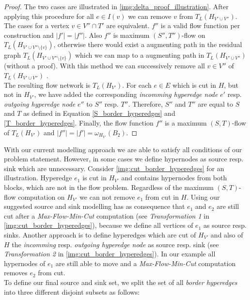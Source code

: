 \begin{proof}
The two cases are illustrated in \autoref{img:delta_proof_illustration}.
After applying this procedure for all $e \in I(v)$ we can remove $v$ from $T_L(H_{V' \cup V''})$. 
The cases for a vertex $v \in V'' \cap T'$ are equivalent. 
$f''$ is a valid flow function per construction and $|f'| = |f''|$. Also $f''$
is maximum $(S'',T'')$-flow on $T_L(H_{V' \cup V''\setminus \{v\}})$, otherwise
there would exist a augmenting path in the residual graph $T_L(H_{V' \cup V''\setminus \{v\}})$
which we can map to a augmenting path in $T_L(H_{V' \cup V''})$ (without a proof). With this method 
we can successively remove all $v \in V''$ of $T_L(H_{V' \cup V''})$ . \\
The resulting  flow network is $T_L(H_{V'})$. For each $e \in E$ which is cut in $H$, but not
in $H_{V'}$, we have added the corresponding \emph{incomming hyperedge node} $e'$
resp. \emph{outgoing hyperedge node} $e''$ to $S''$ resp. $T''$. Therefore, 
$S''$ and $T''$ are equal to $S$ and $T$ as defined in Equation \ref{S_border_hyperedges}
and \ref{T_border_hyperedges}. Finally, the flow function $f''$ is a maximum
$(S,T)$-flow of $T_L(H_{V'})$ and $|f''| = |f'| = \omega_{H_{V'}}(B_2)$.
\end{proof}

With our current modelling approach we are able to satisfy all conditions of
our problem statement. However, in some cases we define hypernodes as source resp.
sink which are unnecessary. Consider \autoref{img:cut_border_hyperedges} for an illustration.
Hyperedge $e_1$ is cut in $H_{V'}$ and contains hypernodes from both
blocks, which are not in the flow problem. Regardless of the maximum $(S,T)$-flow computation on
$H_{V'}$ we can not remove $e_1$ from cut in $H$. Using our suggested source and sink modelling 
has as consequence that $e_1$ and $e_2$ are still cut after a \emph{Max-Flow-Min-Cut} 
computation (see \emph{Transformation 1} in \autoref{img:cut_border_hyperedges}), 
because we define all vertices of $e_1$ as source resp. sinks. Another approach
is to define hyperedges which are cut of $H_{V'}$ and also of $H$ the \emph{incomming}
resp. \emph{outgoing hyperedge node} as source resp. sink (see \emph{Transformation 2} in
\autoref{img:cut_border_hyperedges}). In our example all hypernodes of $e_1$ are still able 
to move and a \emph{Max-Flow-Min-Cut} computation removes $e_2$ from cut.\\
To define our final source and sink set, we split the set of all \emph{border hyperedges} into
three different disjoint subsets as follows:

